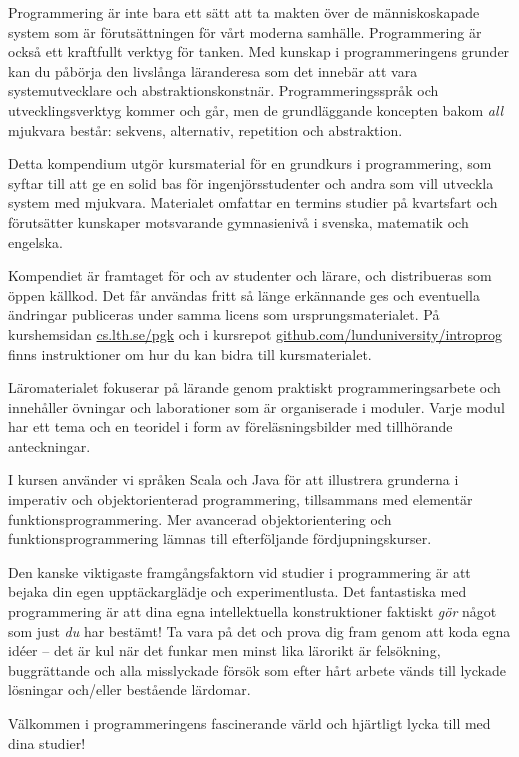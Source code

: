 


Programmering är inte bara ett sätt att ta makten över de människoskapade system som är förutsättningen för vårt moderna samhälle. Programmering är också ett kraftfullt verktyg för tanken. Med kunskap i programmeringens grunder kan du påbörja den livslånga läranderesa som det innebär att vara systemutvecklare och abstraktionskonstnär. Programmeringsspråk och utvecklingsverktyg kommer och går, men de grundläggande koncepten bakom \emph{all} mjukvara består: sekvens, alternativ, repetition och abstraktion. 

Detta kompendium utgör kursmaterial för en grundkurs i programmering, som syftar till att ge en solid bas för ingenjörsstudenter och andra som vill utveckla system med mjukvara. Materialet omfattar en termins studier på kvartsfart och förutsätter kunskaper motsvarande gymnasienivå i svenska, matematik och engelska. 

Kompendiet är framtaget för och av studenter och lärare, och distribueras som öppen källkod. Det får användas fritt så länge erkännande ges och eventuella ändringar publiceras under samma licens som ursprungsmaterialet. På kurshemsidan \href{http://cs.lth.se/pgk}{cs.lth.se/pgk} och i kursrepot \href{http://github.com/lunduniversity/introprog}{github.com/lunduniversity/introprog} finns instruktioner om hur du kan bidra till kursmaterialet.

Läromaterialet fokuserar på lärande genom praktiskt programmeringsarbete och innehåller övningar och laborationer som är organiserade i moduler. Varje modul har ett tema och en teoridel i form av föreläsningsbilder med tillhörande anteckningar. 

I kursen använder vi språken Scala och Java för att illustrera grunderna i imperativ och objektorienterad programmering, tillsammans med elementär funktionsprogrammering. Mer avancerad objektorientering och funktionsprogrammering lämnas till efterföljande fördjupningskurser. 

Den kanske viktigaste framgångsfaktorn vid studier i programmering är att bejaka din egen upptäckarglädje och experimentlusta. Det fantastiska med programmering är att dina egna intellektuella konstruktioner faktiskt \emph{gör} något som just \emph{du} har bestämt! Ta vara på det och prova dig fram genom att koda egna idéer -- det är kul när det funkar men minst lika lärorikt är felsökning, buggrättande och alla misslyckade försök som efter hårt arbete vänds till lyckade lösningar och/eller bestående lärdomar. 

Välkommen i programmeringens fascinerande värld och hjärtligt lycka till med dina studier!



